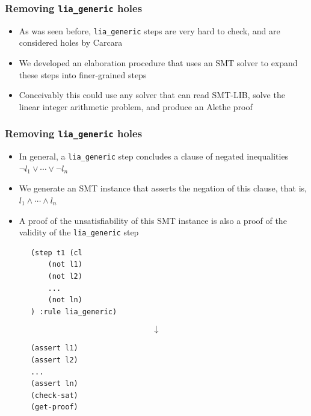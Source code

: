 \documentclass[usepdftitle=false,aspectratio=169]{beamer}
\newcommand\vitem{\vfill\item}
\begin{document}
\begin{frame}
  \frametitle{Removing \texttt{lia\_generic} holes}
  \begin{itemize}
    \item As was seen before, \texttt{lia\_generic} steps are very hard to
    check, and are considered holes by Carcara
    \vitem We developed an elaboration procedure that uses an SMT solver to
    expand these steps into finer-grained steps
    \pause
    \vitem Conceivably this could use any solver that can read SMT-LIB, solve
    the linear integer arithmetic problem, and produce an Alethe proof
  \end{itemize}
\end{frame}

\begin{frame}[fragile]
  \frametitle{Removing \texttt{lia\_generic} holes}
  \begin{minipage}[c][0.6 \textheight]{0.65 \textwidth}
    \begin{itemize}
      \item In general, a \texttt{lia\_generic} step concludes a clause of
      negated inequalities $\neg l_1 \lor \cdots \lor \neg l_n$
      \vitem We generate an SMT instance that asserts the negation of this
      clause, that is, $l_1 \land \cdots \land l_n$
      \vitem A proof of the unsatisfiability of this SMT instance is also a
      proof of the validity of the \texttt{lia\_generic} step
    \end{itemize}
  \end{minipage}
  \hfill
  \begin{minipage}[c]{0.3 \textwidth}
    \begin{verbatim}
      (step t1 (cl
          (not l1)
          (not l2)
          ...
          (not ln)
      ) :rule lia_generic)
    \end{verbatim}
    $$\downarrow$$
    \begin{verbatim}
      (assert l1)
      (assert l2)
      ...
      (assert ln)
      (check-sat)
      (get-proof)
    \end{verbatim}
  \end{minipage}
\end{frame}
\end{document}
